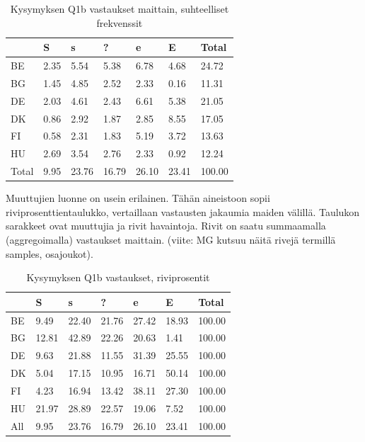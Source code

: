 \documentclass[
  finnish,
]{book}
\begin{document}
\begin{table}

\caption{\label{tab:simpeCA-frekTa1}Kysymyksen Q1b vastaukset maittain, suhteelliset frekvenssit}
\centering
\begin{tabular}[t]{lllllll}
\toprule
  & S & s & ? & e & E & Total\\
\midrule
BE & 2.35 & 5.54 & 5.38 & 6.78 & 4.68 & 24.72\\
BG & 1.45 & 4.85 & 2.52 & 2.33 & 0.16 & 11.31\\
DE & 2.03 & 4.61 & 2.43 & 6.61 & 5.38 & 21.05\\
DK & 0.86 & 2.92 & 1.87 & 2.85 & 8.55 & 17.05\\
FI & 0.58 & 2.31 & 1.83 & 5.19 & 3.72 & 13.63\\
\addlinespace
HU & 2.69 & 3.54 & 2.76 & 2.33 & 0.92 & 12.24\\
Total & 9.95 & 23.76 & 16.79 & 26.10 & 23.41 & 100.00\\
\bottomrule
\end{tabular}
\end{table}

Muuttujien luonne on usein erilainen. Tähän aineistoon sopii
riviprosenttientaulukko, vertaillaan vastausten jakaumia maiden välillä. Taulukon
sarakkeet ovat muuttujia ja rivit havaintoja. Rivit on saatu summaamalla
(aggregoimalla) vastaukset maittain.
(viite: MG kutsuu näitä rivejä termillä samples, osajoukot).

\begin{table}

\caption{\label{tab:simpeCA-rprosTa1}Kysymyksen Q1b vastaukset, riviprosentit}
\centering
\begin{tabular}[t]{lllllll}
\toprule
  & S & s & ? & e & E & Total\\
\midrule
BE & 9.49 & 22.40 & 21.76 & 27.42 & 18.93 & 100.00\\
BG & 12.81 & 42.89 & 22.26 & 20.63 & 1.41 & 100.00\\
DE & 9.63 & 21.88 & 11.55 & 31.39 & 25.55 & 100.00\\
DK & 5.04 & 17.15 & 10.95 & 16.71 & 50.14 & 100.00\\
FI & 4.23 & 16.94 & 13.42 & 38.11 & 27.30 & 100.00\\
\addlinespace
HU & 21.97 & 28.89 & 22.57 & 19.06 & 7.52 & 100.00\\
All & 9.95 & 23.76 & 16.79 & 26.10 & 23.41 & 100.00\\
\bottomrule
\end{tabular}
\end{table}
\end{document}
